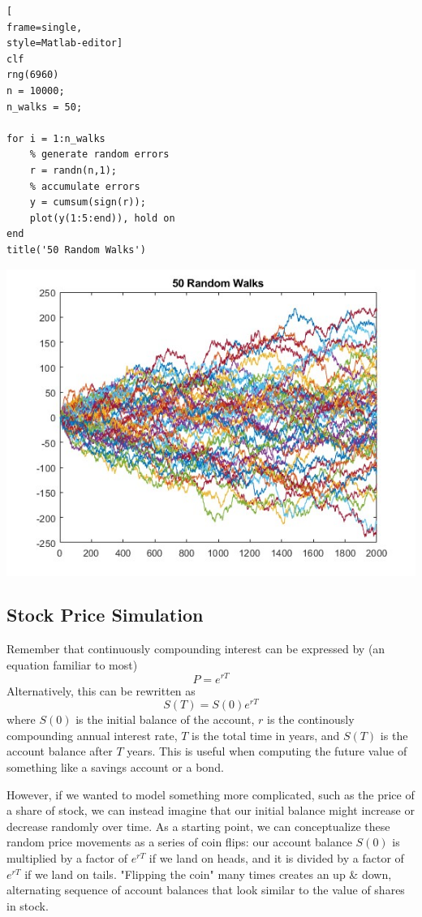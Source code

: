\documentclass[letterpaper,12pt]{article}
\begin{document}
\begin{lstlisting}[
frame=single,
style=Matlab-editor]
clf
rng(6960)
n = 10000;
n_walks = 50;

for i = 1:n_walks
    % generate random errors
    r = randn(n,1); 
    % accumulate errors
    y = cumsum(sign(r));	
    plot(y(1:5:end)), hold on
end
title('50 Random Walks')
\end{lstlisting}
\includegraphics[scale=0.7]{random_walks}

\subsection*{Stock Price Simulation}
Remember that continuously compounding interest can be expressed by (an equation 
familiar to most)
$$P = e^{rT}$$
Alternatively, this can be rewritten as
$$S(T) = S(0) e^{rT}$$
where $S(0)$ is the initial balance of the account, $r$ is the continously 
compounding annual interest rate, $T$ is the total time in years, and $S(T)$ 
is the account balance after $T$ years. This is useful when computing the future 
value of something like a savings account or a bond.

However, if we wanted to model something more complicated, such as the price 
of a share of stock, we can instead imagine that our initial balance might increase 
or decrease randomly over time. As a starting point, we can conceptualize these 
random price movements as a series of coin flips: our account balance $S(0)$ 
is multiplied by a factor of $e^{rT}$ if we land on heads, and it is divided 
by a factor of $e^{rT}$ if we land on tails. "Flipping the coin" many times 
creates an up \& down, alternating sequence of account balances that look similar 
to the value of shares in stock.
\end{document}
